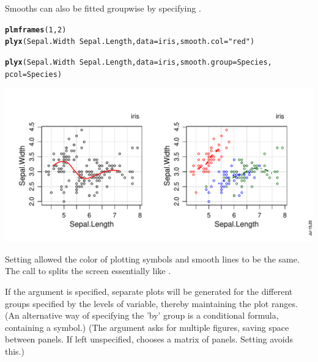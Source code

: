\documentclass[11pt]{article}\usepackage[]{graphicx}\usepackage[]{color}
\makeatletter
\def\maxwidth{ %
  \ifdim\Gin@nat@width>\linewidth
    \linewidth
  \else
    \Gin@nat@width
  \fi
}
\newcommand{\hlnum}[1]{\textcolor[rgb]{0.686,0.059,0.569}{#1}}%
\newcommand{\hlstr}[1]{\textcolor[rgb]{0.192,0.494,0.8}{#1}}%
\newcommand{\hlopt}[1]{\textcolor[rgb]{0,0,0}{#1}}%
\newcommand{\hlstd}[1]{\textcolor[rgb]{0.345,0.345,0.345}{#1}}%
\newcommand{\hlkwc}[1]{\textcolor[rgb]{0.333,0.667,0.333}{#1}}%
\newcommand{\hlkwd}[1]{\textcolor[rgb]{0.737,0.353,0.396}{\textbf{#1}}}%
\newenvironment{kframe}{%
 \def\at@end@of@kframe{}%
 \ifinner\ifhmode%
  \def\at@end@of@kframe{\end{minipage}}%
  \begin{minipage}{\columnwidth}%
 \fi\fi%
 \def\FrameCommand##1{\hskip\@totalleftmargin \hskip-\fboxsep
 \colorbox{shadecolor}{##1}\hskip-\fboxsep
     \hskip-\linewidth \hskip-\@totalleftmargin \hskip\columnwidth}%
 \MakeFramed {\advance\hsize-\width
   \@totalleftmargin\z@ \linewidth\hsize
   \@setminipage}}%
 {\par\unskip\endMakeFramed%
 \at@end@of@kframe}
\newenvironment{knitrout}{}{} %
\makeatother
\begin{document}
Smooths can also be fitted groupwise by specifying .

\begin{knitrout}
\color{fgcolor}\begin{kframe}
\begin{alltt}
\hlkwd{plmframes}\hlstd{(}\hlnum{1}\hlstd{,}\hlnum{2}\hlstd{)}
\hlkwd{plyx}\hlstd{(Sepal.Width}\hlopt{~}\hlstd{Sepal.Length,} \hlkwc{data}\hlstd{=iris,} \hlkwc{smooth.col}\hlstd{=}\hlstr{"red"}\hlstd{)}

\hlkwd{plyx}\hlstd{(Sepal.Width}\hlopt{~}\hlstd{Sepal.Length,} \hlkwc{data}\hlstd{=iris,} \hlkwc{smooth.group}\hlstd{=Species,}
     \hlkwc{pcol}\hlstd{=Species)}
\end{alltt}
\end{kframe}
\includegraphics[width=\maxwidth]{figure/plyx_smooth-1} 
\end{knitrout}

Setting  allowed the color of plotting symbols and smooth
lines to be the same.
The call to  splits the screen essentially like 
.

If the argument  is specified, separate plots will be generated
for the different groups specified by the levels of  variable, 
thereby maintaining the plot ranges. (An alternative way of specifying the 'by' group is a conditional formula, containing a \code{|} symbol.)
(The argument  asks for multiple figures, saving space between panels. 
If left unspecified,  chooses a matrix of panels. 
Setting  avoids this.)
\end{document}
